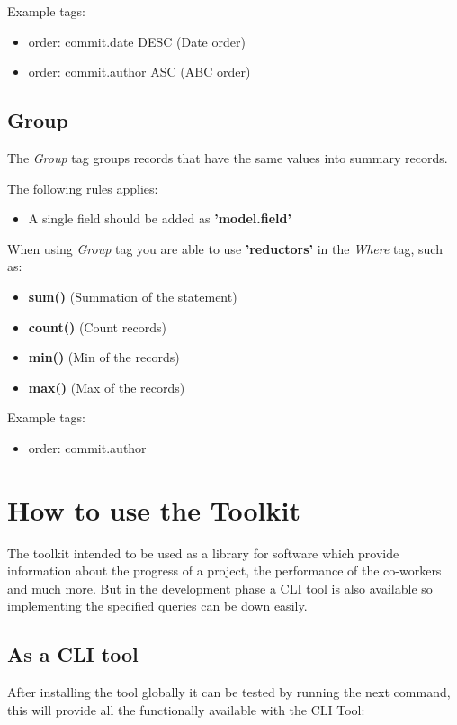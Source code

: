 Example tags:
\begin{itemize}
	\item order: commit.date DESC (Date order)
	\item order: commit.author ASC (ABC order)
\end{itemize}

\subsection{Group}

The \textit{Group} tag groups records that have the same values into summary records.

The following rules applies:
\begin{itemize}
	\item A single field should be added as \textbf{'{model}.{field}'}
\end{itemize}

When using \textit{Group} tag you are able to use \textbf{'reductors'} in the \textit{Where} tag, such as:
\begin{itemize}
	\item \textbf{sum()} (Summation of the statement)
	\item \textbf{count()} (Count records)
	\item \textbf{min()} (Min of the records)
	\item \textbf{max()} (Max of the records)
\end{itemize}

Example tags:
\begin{itemize}
	\item order: commit.author
\end{itemize}

\section{How to use the Toolkit}
The toolkit intended to be used as a library for software which provide information about the progress of a project, the performance of the co-workers and much more. But in the development phase a CLI tool is also available so implementing the specified queries can be down easily.

\subsection{As a CLI tool}
After installing the tool globally it can be tested by running the next command, this will provide all the functionally available with the CLI Tool:

